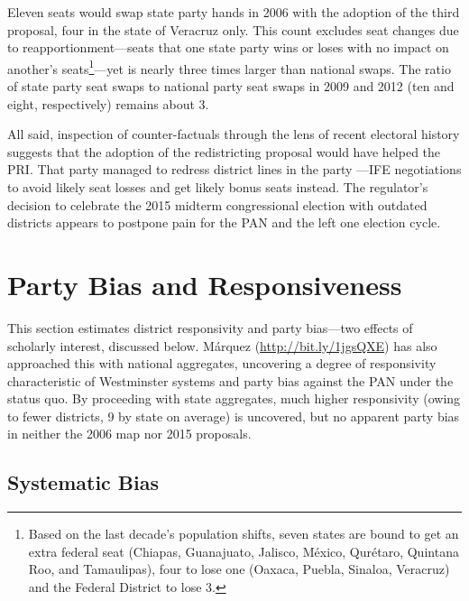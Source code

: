 \documentclass[letter,12pt]{article}
\begin{document}
Eleven seats would swap state party hands in 2006 with the adoption of the third proposal, four in the state of Veracruz only. This count excludes seat changes due to reapportionment---seats that one state party wins or loses with no impact on another's seats\footnote{Based on the last decade's population shifts, seven states are bound to get an extra federal seat (Chiapas, Guanajuato, Jalisco, M\'exico, Qur\'etaro, Quintana Roo, and Tamaulipas), four to lose one (Oaxaca, Puebla, Sinaloa, Veracruz) and the Federal District to lose 3.}---yet is nearly three times larger than national swaps. The ratio of state party seat swaps to national party seat swaps in 2009 and 2012 (ten and eight, respectively) remains about 3. 

All said, inspection of counter-factuals through the lens of recent electoral history suggests that the adoption of the redistricting proposal would have helped the PRI. That party managed to redress district lines in the party ---IFE negotiations to avoid likely seat losses and get likely bonus seats instead. The regulator's decision to celebrate the 2015 midterm congressional election with outdated districts appears to postpone pain for the PAN and the left one election cycle. 


\section{Party Bias and Responsiveness}

This section estimates district responsivity and party bias---two effects of scholarly interest, discussed below. M\'arquez (\href{http://bit.ly/1jgsQXE}{\url{http://bit.ly/1jgsQXE}}) has also approached this with national aggregates, uncovering a degree of responsivity characteristic of Westminster systems and party bias against the PAN under the status quo. By proceeding with state aggregates, much higher responsivity (owing to fewer districts, 9 by state on average) is uncovered, but no apparent party bias in neither the 2006 map nor 2015 proposals. 

\subsection{Systematic Bias}
\end{document}
